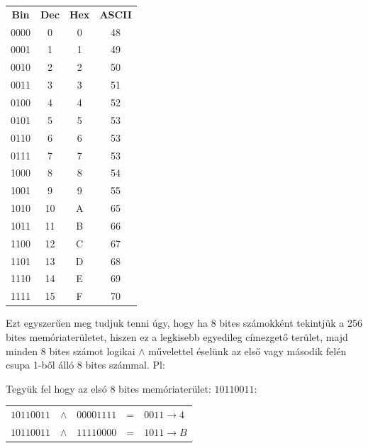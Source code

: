 \begin{table}[H]
    \centering
    \begin{tabular}{cccc}

        \textbf{Bin}   &   \textbf{Dec}   &   \textbf{Hex}   &   \textbf{ASCII} \\
        0000   &   0    &   0   &   48 \\
        0001   &   1    &   1   &   49 \\
        0010   &   2    &   2   &   50 \\
        0011   &   3    &   3   &   51 \\
        0100   &   4    &   4   &   52 \\
        0101   &   5    &   5   &   53 \\
        0110   &   6    &   6   &   53 \\
        0111   &   7    &   7   &   53 \\
        1000   &   8    &   8   &   54 \\
        1001   &   9    &   9   &   55 \\
        1010   &   10   &   A   &   65 \\
        1011   &   11   &   B   &   66 \\
        1100   &   12   &   C   &   67 \\
        1101   &   13   &   D   &   68 \\
        1110   &   14   &   E   &   69 \\
        1111   &   15   &   F   &   70 \\
    
    \end{tabular}
\end{table}


Ezt egyszerűen meg tudjuk tenni úgy, hogy ha 8 bites számokként tekintjük a 256 bites memóriaterületet, hiszen ez a legkisebb egyedileg címezgető terület, majd minden 8 bites számot logikai $\land$ művelettel éselünk az első vagy második felén csupa 1-ből álló 8 bites számmal. Pl:

Tegyük fel hogy az elsó 8 bites memóriaterület: $10110011$:


\begin{table}[H]
    \centering
    \begin{tabular}{rcccl}
    
        $ 10110011 $ & $\land$ & $ 00001111 $ & = & $0011 \xrightarrow{} 4 $ \\
        $ 10110011 $ & $\land$ & $ 11110000 $ & = & $1011 \xrightarrow{} B $ \\
        
    \end{tabular}
\end{table}


